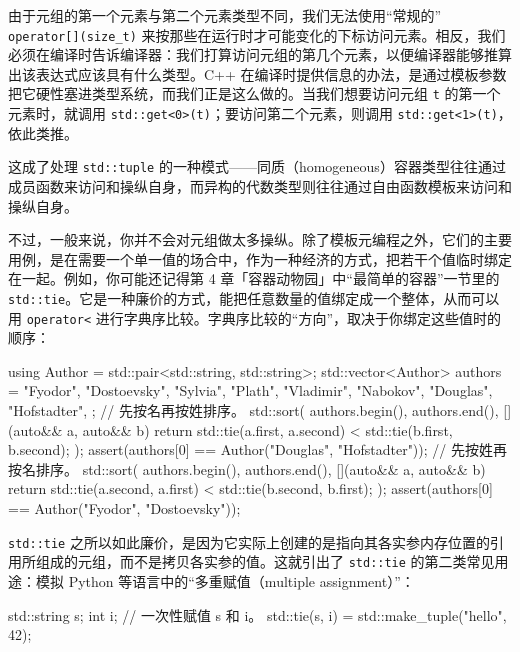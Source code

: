 由于元组的第一个元素与第二个元素类型不同，我们无法使用“常规的” \texttt{operator[](\allowbreak{}size\_\allowbreak{}t)\allowbreak{}} 来按那些在运行时才可能变化的下标访问元素。相反，我们必须在编译时告诉编译器：我们打算访问元组的第几个元素，以便编译器能够推算出该表达式应该具有什么类型。C++ 在编译时提供信息的办法，是通过模板参数把它硬性塞进类型系统，而我们正是这么做的。当我们想要访问元组 \texttt{t} 的第一个元素时，就调用 \texttt{std::\allowbreak{}get<\allowbreak{}0>\allowbreak{}(\allowbreak{}t)\allowbreak{}}；要访问第二个元素，则调用 \texttt{std::\allowbreak{}get<\allowbreak{}1>\allowbreak{}(\allowbreak{}t)\allowbreak{}}，依此类推。

这成了处理 \texttt{std::\allowbreak{}tuple} 的一种模式——同质（homogeneous）容器类型往往通过成员函数来访问和操纵自身，而异构的代数类型则往往通过自由函数模板来访问和操纵自身。

不过，一般来说，你并不会对元组做太多操纵。除了模板元编程之外，它们的主要用例，是在需要一个单一值的场合中，作为一种经济的方式，把若干个值临时绑定在一起。例如，你可能还记得第 4 章「容器动物园」中“最简单的容器”一节里的 \texttt{std::\allowbreak{}tie}。它是一种廉价的方式，能把任意数量的值绑定成一个整体，从而可以用 \texttt{operator<} 进行字典序比较。字典序比较的“方向”，取决于你绑定这些值时的顺序：

\begin{codebox}[cpp]
    using Author = std::pair<std::string, std::string>;
    std::vector<Author> authors = {
      {"Fyodor", "Dostoevsky"},
      {"Sylvia", "Plath"},
      {"Vladimir", "Nabokov"},
      {"Douglas", "Hofstadter"},
    };
    // 先按名再按姓排序。
    std::sort(
      authors.begin(), authors.end(),
      [](auto&& a, auto&& b) {
        return std::tie(a.first, a.second) < std::tie(b.first, b.second);
      }
    );
    assert(authors[0] == Author("Douglas", "Hofstadter"));
    // 先按姓再按名排序。
    std::sort(
      authors.begin(), authors.end(),
      [](auto&& a, auto&& b) {
        return std::tie(a.second, a.first) < std::tie(b.second, b.first);
      }
    );
    assert(authors[0] == Author("Fyodor", "Dostoevsky"));
\end{codebox}

\texttt{std::\allowbreak{}tie} 之所以如此廉价，是因为它实际上创建的是指向其各实参内存位置的引用所组成的元组，而不是拷贝各实参的值。这就引出了 \texttt{std::\allowbreak{}tie} 的第二类常见用途：模拟 Python 等语言中的“多重赋值（multiple assignment）”：

\begin{codebox}[cpp]
    std::string s;
    int i;
    // 一次性赋值 s 和 i。
    std::tie(s, i) = std::make_tuple("hello", 42);
\end{codebox}

